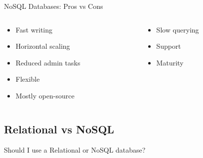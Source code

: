 \begin{frame}{NoSQL Databases: Pros vs Cons}
    \begin{columns}[t]
        \begin{column}{.5\textwidth}
            \begin{exampleblock}{\huge\faThumbsOUp}
                \begin{itemize}
                    \item Fast writing
                    \item Horizontal scaling
                    \item Reduced admin tasks
                    \item Flexible
                    \item Mostly open-source
                \end{itemize}
            \end{exampleblock}
        \end{column}
        \begin{column}{.5\textwidth}
            \begin{alertblock}{\huge\faThumbsODown}
                \begin{itemize}
                    \item Slow querying
                    \item Support
                    \item Maturity
                \end{itemize}
            \end{alertblock}
        \end{column}
    \end{columns}
\end{frame}

\subsection{Relational vs NoSQL}
\begin{frame}[standout]
    \huge{Should I use a Relational or NoSQL database?}

    \huge{\faDatabase}
\end{frame}
